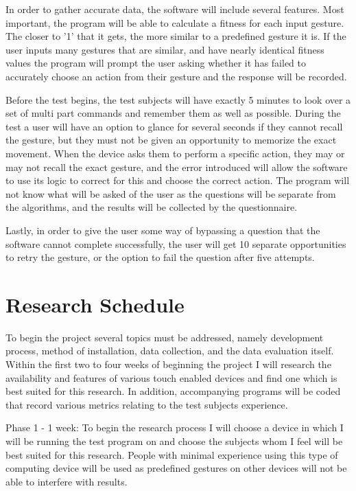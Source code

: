 \documentclass[11pt]{article}
\begin{document}
In order to gather accurate data, the software will include several features. Most important, the program will be able to calculate a fitness for each input gesture. The closer to '1' that it gets, the more similar to a predefined gesture it is. If the user inputs many gestures that are similar, and have nearly identical fitness values the program will prompt the user asking whether it has failed to accurately choose an action from their gesture and the response will be recorded.

Before the test begins, the test subjects will have exactly 5 minutes to look over a set of multi part commands and remember them as well as possible. During the test a user will have an option to glance for several seconds if they cannot recall the gesture, but they must not be given an opportunity to memorize the exact movement. When the device asks them to perform a specific action, they may or may not recall the exact gesture, and the error introduced will allow the software to use its logic to correct for this and choose the correct action. The program will not know what will be asked of the user as the questions will be separate from the algorithms, and the results will be collected by the questionnaire.

Lastly, in order to give the user some way of bypassing a question that the software cannot complete successfully, the user will get 10 separate opportunities to retry the gesture, or the option to fail the question after five attempts.

\vspace*{-.1in}
\section{Research Schedule}
\label{sec:schedule}
\vspace*{-.1in}

To begin the project several topics must be addressed, namely development process, method of installation, data collection, and the data evaluation itself. Within the first two to four weeks of beginning the project I will research the availability and features of various touch enabled devices and find one which is best suited for this research. In addition, accompanying programs will be coded that record various metrics relating to the test subjects experience. 

Phase 1 - 1 week: To begin the research process I will choose a device in which I will be running the test program on and choose the subjects whom I feel will be best suited for this research. People with minimal experience using this type of computing device will be used as predefined gestures on other devices will not be able to interfere with results.
\end{document}
